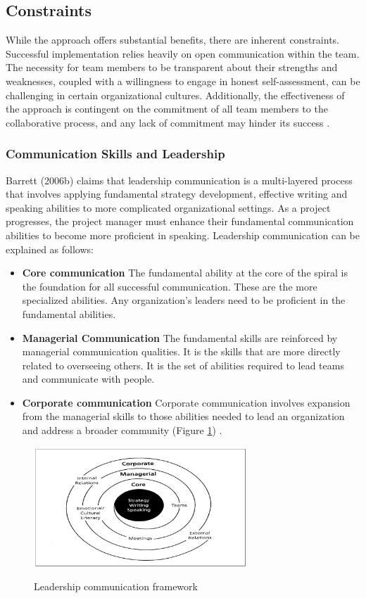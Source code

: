 \documentclass[11pt]{article}
\begin{document}
\subsection{Constraints}
While the approach offers substantial benefits, there are inherent constraints. Successful implementation relies heavily on open communication within the team. The necessity for team members to be transparent about their strengths and weaknesses, coupled with a willingness to engage in honest self-assessment, can be challenging in certain organizational cultures. Additionally, the effectiveness of the approach is contingent on the commitment of all team members to the collaborative process, and any lack of commitment may hinder its success \cite{Barrett2006}.

\subsubsection{Communication Skills and Leadership}
Barrett (2006b) claims that leadership communication is a multi-layered process that involves applying fundamental strategy development, effective writing and speaking abilities to more complicated organizational settings.
As a project progresses, the project manager must enhance their fundamental communication abilities to become more proficient in speaking.
Leadership communication can be explained as follows:
\begin{itemize}
\item \textbf{Core communication} The fundamental ability at the core of the spiral is the foundation for all successful communication. These are the more specialized abilities. Any organization's leaders need to be proficient in the fundamental abilities.
\item \textbf{Managerial Communication} The fundamental skills are reinforced by managerial communication qualities. It is the skills that are more directly related to overseeing others. It is the set of abilities required to lead teams and communicate with people.
\item \textbf{Corporate communication} Corporate communication involves expansion from the managerial skills to those abilities needed to lead an organization and address a broader community (Figure \ref{leadership communication}) \cite{Barrett2006}.
\end{itemize}

\begin{figure}[htbp]
    \centering
    \includegraphics[width=8cm]{pic.png}
    \label{fig:Framework}
    \caption{\label{leadership communication}Leadership communication framework \cite{Barrett2006}}
\end{figure}
\end{document}

